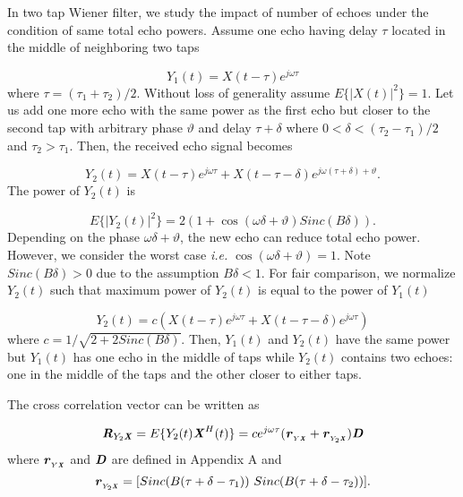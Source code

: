 \documentclass[twocolumn]{IEEEtran}
\begin{document}
In two tap Wiener filter, we study the impact of number of echoes
under the condition of same total echo powers. Assume one echo
having delay $\tau$ located in the middle of neighboring two taps

\begin{equation}
Y_1(t)= X (t-\tau)e^{j\omega \tau}
\end{equation}
where $\tau=(\tau_1+\tau_2)/2$. Without loss of generality assume
$E\{|X(t)|^2 \}=1$. Let us add one more echo with the same power as
the first echo but closer to the second tap with arbitrary phase
$\vartheta$ and delay $\tau+\delta$ where $0 < \delta<
(\tau_2-\tau_1)/2$ and $\tau_2>\tau_1$. Then, the received echo
signal becomes

\begin{equation}
Y_2(t) =  X (t-\tau)e^{j\omega \tau} + X (t-\tau-\delta)e^{j\omega
(\tau+\delta)+\vartheta}.
\end{equation}
The power of $Y_2(t)$ is

\begin{equation}
E\{ |Y_2(t)|^2 \}= 2 \left ( 1 +  \cos
(\omega\delta+\vartheta)Sinc(B\delta) \right ).
\end{equation}
Depending on the phase $\omega\delta+\vartheta$, the new echo can
reduce total echo power. However, we consider the worst case
\emph{i.e.} $\cos (\omega\delta+\vartheta)=1$. Note
$Sinc(B\delta)>0$ due to the assumption $B\delta<1$. For fair
comparison, we normalize $Y_2(t)$ such that maximum power of
$Y_2(t)$ is equal to the power of $Y_1(t)$

\begin{equation}
Y_2(t) = c \left ( X (t-\tau)e^{j\omega \tau} + X
(t-\tau-\delta)e^{j\omega \tau} \right )
\end{equation}
where $c=1/\sqrt{2+2Sinc(B\delta)}$. Then, $Y_1(t)$ and $Y_2(t)$
have the same power but $Y_1(t)$ has one echo in the middle of taps
while $Y_2(t)$ contains two echoes: one in the middle of the taps
and the other closer to either taps.

The cross correlation vector can be written as

\begin{equation}
\textbf{\textit{R}}_{Y_2\textbf{\textit{X}}}=E\{ Y_2(t)
\textbf{\textit{X}}^H(t)\} = c e^{j\omega \tau}
(\textbf{\textit{r}}_{{}_{Y\textbf{\textit{X}}}} +
\textbf{\textit{r}}_{{}_{Y_2\textbf{\textit{X}}}})\textbf{\textit{D}}
\end{equation}
where $\textbf{\textit{r}}_{{}_{Y\textbf{\textit{X}}}}$ and
$\textbf{\textit{D}}$ are defined in Appendix A and
\begin{equation}
\textbf{\textit{r}}_{{}_{Y_2\textbf{\textit{X}}}}=[Sinc(B(\tau+\delta-\tau_1))~Sinc(B(\tau+\delta-\tau_2))].
\end{equation}
\end{document}

